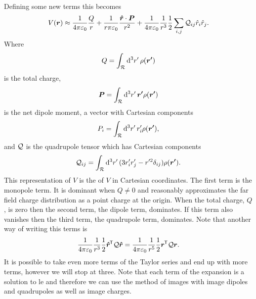     Defining some new terms this becomes
    \[V(\bm{r}) \approx \frac{1}{4\pi\varepsilon_0}\frac{Q}{r} + \frac{1}{r\pi\varepsilon_0}\frac{\bm{\hat{r}}\cdot\bm{P}}{r^2} + \frac{1}{4\pi\varepsilon_0}\frac{1}{r^3}\frac{1}{2}\sum_{i, j}\mathcal{Q}_{ij}\hat{r}_i\hat{r}_j.\]
    Where
    \[Q = \int_{\mathcal{R}} \dd[3]{r'}\rho(\bm{r'})\]
    is the total charge,
    \[\bm{P} = \int_{\mathcal{R}} \dd[3]{r'}\bm{r'}\rho(\bm{r'})\]
    is the net dipole moment, a vector with Cartesian components
    \[P_i = \int_{\mathcal{R}} \dd[3]{r'}r'_i\rho(\bm{r'}),\]
    and \(\mathcal{Q}\) is the quadrupole tensor which has Cartesian components
    \[\mathcal{Q}_{ij} = \int_{\mathcal{R}}\dd[3]{r'}(3r'_ir'_j - r'^2\delta_{ij})\rho(\bm{r'}).\]
    This representation of \(V\) is the  of \(V\) in Cartesian coordinates.
    The first term is the monopole term.
    It is dominant when \(Q\ne 0\) and reasonably approximates the far field charge distribution as a point charge at the origin.
    When the total charge, \(Q\), is zero then the second term, the dipole term, dominates.
    If this term also vanishes then the third term, the quadrupole term, dominates.
    Note that another way of writing this terms is
    \[\frac{1}{4\pi\varepsilon_0}\frac{1}{r^3}\frac{1}{2} \bm{\hat{r}}^{\mkern-1.5mu\mathsf{T}}\mathcal{Q}\bm{\hat{r}} = \frac{1}{4\pi\varepsilon_0}\frac{1}{r^5}\frac{1}{2} \bm{r}^{\mkern-1.5mu\mathsf{T}}\mathcal{Q}\bm{r}.\]
    It is possible to take even more terms of the Taylor series and end up with more terms, however we will stop at three.
    Note that each term of the expansion is a solution to \gls{le} and therefore we can use the method of images with image dipoles and quadrupoles as well as image charges.
    
